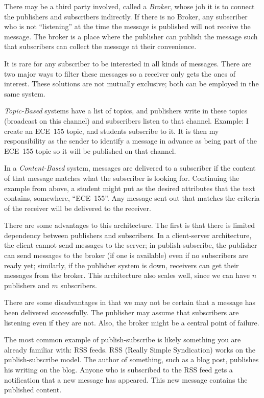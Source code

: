 There may be a third party involved, called a \textit{Broker}, whose job it is to connect the publishers and subscribers indirectly. If there is no Broker, any subscriber who is not ``listening'' at the time the message is published will not receive the message. The broker is a place where the publisher can publish the message such that subscribers can collect the message at their convenience.

It is rare for any subscriber to be interested in all kinds of messages. There are two major ways to filter these messages so a receiver only gets the ones of interest. These solutions are not mutually exclusive; both can be employed in the same system.

\textit{Topic-Based} systems have a list of topics, and publishers write in these topics (broadcast on this channel) and subscribers listen to that channel. Example: I create an ECE~155 topic, and students subscribe to it. It is then my responsibility as the sender to identify a message in advance as being part of the ECE~155 topic so it will be published on that channel. 

In a \textit{Content-Based} system, messages are delivered to a subscriber if the content of that message matches what the subscriber is looking for. Continuing the example from above, a student might put as the desired attributes that the text contains, somewhere, ``ECE~155''. Any message sent out that matches the criteria of the receiver will be delivered to the receiver.

There are some advantages to this architecture. The first is that there is limited dependency between publishers and subscribers. In a client-server architecture, the client cannot send messages to the server; in publish-subscribe, the publisher can send messages to the broker (if one is available) even if no subscribers are ready yet; similarly, if the publisher system is down, receivers can get their messages from the broker. This architecture also scales well, since we can have $n$ publishers and $m$ subscribers.

There are some disadvantages in that we may not be certain that a message has been delivered successfully. The publisher may assume that subscribers are listening even if they are not. Also, the broker might be a central point of failure.

The most common example of publish-subscribe is likely something you are already familiar with: RSS feeds. RSS (Really Simple Syndication) works on the publish-subscribe model. The author of something, such as a blog post, publishes his writing on the blog. Anyone who is subscribed to the RSS feed gets a notification that a new message has appeared. This new message contains the published content.

